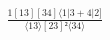 \documentclass[varwidth, border=5pt]{standalone}
\begin{document}
\begin{my}
$\begin{gathered}
\scriptscriptstyle\frac{1[13][34]⟨1|3+4|2]}{⟨13⟩[23]²⟨34⟩}
\end{gathered}$
\end{my}
\end{document}
